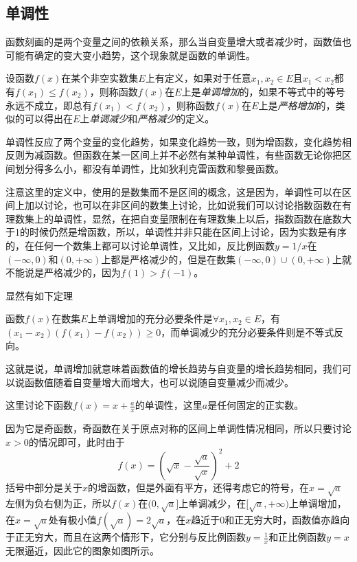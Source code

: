 \subsection{单调性}
\label{sec:monotonicity-of-function}

函数刻画的是两个变量之间的依赖关系，那么当自变量增大或者减少时，函数值也可能有确定的变大变小趋势，这个现象就是函数的单调性。

\begin{definition}
  设函数$f(x)$在某个非空实数集$E$上有定义，如果对于任意$x_1,x_2 \in E$且$x_1<x_2$都有$f(x_1) \leqslant f(x_2)$，则称函数$f(x)$在$E$上是\emph{单调增加}的，如果不等式中的等号永远不成立，即总有$f(x_1)<f(x_2)$，则称函数$f(x)$在$E$上是\emph{严格增加}的，类似的可以得出在$E$上\emph{单调减少}和\emph{严格减少}的定义。
\end{definition}

单调性反应了两个变量的变化趋势，如果变化趋势一致，则为增函数，变化趋势相反则为减函数。但函数在某一区间上并不必然有某种单调性，有些函数无论你把区间划分得多么小，都没有单调性，比如狄利克雷函数和黎曼函数。

注意这里的定义中，使用的是数集而不是区间的概念，这是因为，单调性可以在区间上加以讨论，也可以在非区间的数集上讨论，比如说我们可以讨论指数函数在有理数集上的单调性，显然，在把自变量限制在有理数集上以后，指数函数在底数大于1的时候仍然是增函数，所以，单调性并非只能在区间上讨论，因为实数是有序的，在任何一个数集上都可以讨论单调性，又比如，反比例函数$y=1/x$在$(-\infty,0)$和$(0,+\infty)$上都是严格减少的，但是在数集$(-\infty,0)\cup(0,+\infty)$上就不能说是严格减少的，因为$f(1)>f(-1)$。

显然有如下定理
\begin{theorem}
  \label{theorem:monotonicity-inequality}
  函数$f(x)$在数集$E$上单调增加的充分必要条件是$\forall x_1,x_2 \in E$，有$(x_1-x_2)(f(x_1)-f(x_2)) \geqslant 0$，而单调减少的充分必要条件则是不等式反向。
\end{theorem}

这就是说，单调增加就意味着函数值的增长趋势与自变量的增长趋势相同，我们可以说函数值随着自变量增大而增大，也可以说随自变量减少而减少。

\begin{example}
这里讨论下函数$f(x)=x+\frac{a}{x}$的单调性，这里$a$是任何固定的正实数。

因为它是奇函数，奇函数在关于原点对称的区间上单调性情况相同，所以只要讨论$x>0$的情况即可，此时由于
$$
f(x)=\left( \sqrt{x}-\frac{\sqrt{a}}{\sqrt{x}} \right)^2+2
$$
括号中部分是关于$x$的增函数，但是外面有平方，还得考虑它的符号，在$x=\sqrt{a}$左侧为负右侧为正，所以$f(x)$在$(0,\sqrt{a}]$上单调减少，在$[\sqrt{a},+\infty)$上单调增加，在$x=\sqrt{a}$处有极小值$f(\sqrt{a})=2\sqrt{a}$，在$x$趋近于0和正无穷大时，函数值亦趋向于正无穷大，而且在这两个情形下，它分别与反比例函数$y=\frac{1}{x}$和正比例函数$y=x$无限逼近，因此它的图象如图所示。
\end{example}


